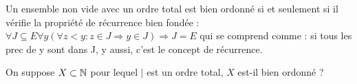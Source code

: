 \documentclass{report}
\begin{document}
\begin{proposition}
    Un ensemble non vide avec un ordre total est bien ordonné si et seulement si il
    vérifie la propriété de récurrence bien fondée :
    \(\forall J\subseteq E\forall y(\forall z<y\colon z\in J\Rightarrow y\in J)\Rightarrow J=E\)
    qui se comprend comme : si tous les prec de y sont dans J, y aussi, c'est le concept
    de récurrence.
\end{proposition}

\begin{exo}
    On suppose \(X\subset \mathbb{N}\) pour lequel \(|\) est un ordre total, \(X\) est-il
    bien ordonné ?
\end{exo}
\end{document}
